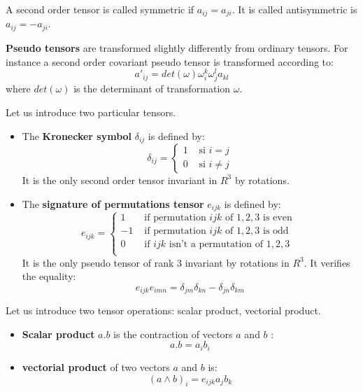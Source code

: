 \documentclass[12pt]{book}
\begin{document}
A second order tensor is called symmetric if $a_{ij}=a_{ji}$. It is called
antisymmetric is $a_{ij}=-a_{ji}$.

{\bf Pseudo tensors} are transformed slightly differently from ordinary tensors. For
instance a second order covariant pseudo tensor is transformed according to:
\begin{equation}
a'_{ij}=det(\omega)\omega^k_i\omega^l_j a_{kl}
\end{equation}
where $det(\omega)$ is the determinant of transformation $\omega$.

\label{secformultens}
Let us introduce two particular tensors.
\begin{itemize}
\item The {\bf Kronecker symbol} $\delta_{ij}$ is defined by:
\begin{equation}
\delta_{ij}=\left\{\begin{array}{ll}
 1& \mbox{ si  }i=j\\
 0& \mbox{ si  }i\neq j
\end{array}\right.
\end{equation}
It is the only second order tensor invariant in $R^3$ by rotations.
\item The {\bf signature of permutations tensor} $e_{ijk}$ is defined by:
\begin{equation}
e_{ijk}=\left\{\begin{array}{ll}
 1& \mbox{ if permutation  }ijk\mbox{ of  }1,2,3\mbox{  is  even }\\
 -1&  \mbox{ if permutation  }ijk\mbox{ of  }1,2,3\mbox{  is  odd }\\
0& \mbox{ if  }ijk\mbox{ isn't a permutation of  }1,2,3\\
\end{array}\right.
\end{equation}
It is the only pseudo tensor of rank 3 invariant by rotations in $R^3$.
It verifies the equality:
\begin{equation}
e_{ijk}e_{imn}=\delta_{jm}\delta_{kn}-\delta_{jn}\delta_{km}
\end{equation}
\end{itemize}

Let us introduce two tensor operations: scalar product, vectorial product.
\begin{itemize}
\item {\bf Scalar product} $a.b$ is the contraction of vectors $a$ and $b$ :
\begin{equation}
a.b=a_ib_i
\end{equation}
\item {\bf vectorial product} of two vectors $a$ and $b$ is:
\begin{equation}
(a\wedge b)_i=e_{ijk}a_jb_k
\end{equation}
\end{itemize}
\end{document}
